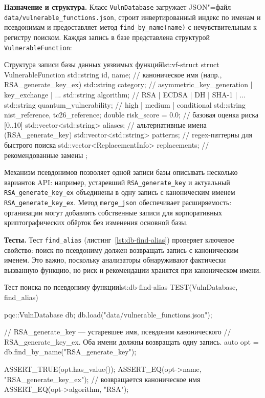 \textbf{Назначение и структура.}
Класс \texttt{VulnDatabase} загружает JSON"=файл
\texttt{data/\allowbreak vulnerable\_functions.json},
строит инвертированный индекс по именам и псевдонимам
и предоставляет метод \texttt{find\_by\_name(name)} с нечувствительным
к регистру поиском.
Каждая запись в базе представлена структурой \texttt{VulnerableFunction}:

\begin{itmolisting}[C++]{Структура записи базы данных уязвимых функций}{lst:vf-struct}
struct VulnerableFunction {
    std::string id, name;          // каноническое имя (напр., RSA_generate_key_ex)
    std::string category;          // asymmetric_key_generation | key_exchange | ...
    std::string algorithm;         // RSA | ECDSA | DH | SHA-1 | ...
    std::string quantum_vulnerability; // high | medium | conditional
    std::string nist_reference, tc26_reference;
    double risk_score = 0.0;       // базовая оценка риска [0..10]
    std::vector<std::string> aliases;  // альтернативные имена (RSA_generate_key)
    std::vector<std::string> patterns; // regex-паттерны для быстрого поиска
    std::vector<ReplacementInfo> replacements; // рекомендованные замены
};
\end{itmolisting}

Механизм псевдонимов позволяет одной записи базы описывать несколько
вариантов API: например, устаревший \texttt{RSA\_generate\_key} и
актуальный \texttt{RSA\_generate\_key\_ex} объединены в одну запись
с каноническим именем \texttt{RSA\_generate\_key\_ex}.
Метод \texttt{merge\_json} обеспечивает расширяемость: организации
могут добавлять собственные записи для корпоративных криптографических
обёрток без изменения основной базы.

\textbf{Тесты.}
Тест \texttt{find\_alias} (листинг~\ref{lst:db-find-alias}) проверяет
ключевое свойство: поиск по псевдониму должен возвращать запись
с каноническим именем.
Это важно, поскольку анализаторы обнаруживают фактически вызванную
функцию, но риск и рекомендации хранятся при каноническом имени.

\begin{itmolisting}[C++]{Тест поиска по псевдониму функции}{lst:db-find-alias}
TEST(VulnDatabase, find_alias) {
    pqc::VulnDatabase db;
    db.load("data/vulnerable_functions.json");

    // RSA_generate_key — устаревшее имя, псевдоним канонического
    // RSA_generate_key_ex. Оба имени должны возвращать одну запись.
    auto opt = db.find_by_name("RSA_generate_key");

    ASSERT_TRUE(opt.has_value());
    ASSERT_EQ(opt->name, "RSA_generate_key_ex"); // возвращается каноническое имя
    ASSERT_EQ(opt->algorithm, "RSA");
}
\end{itmolisting}

